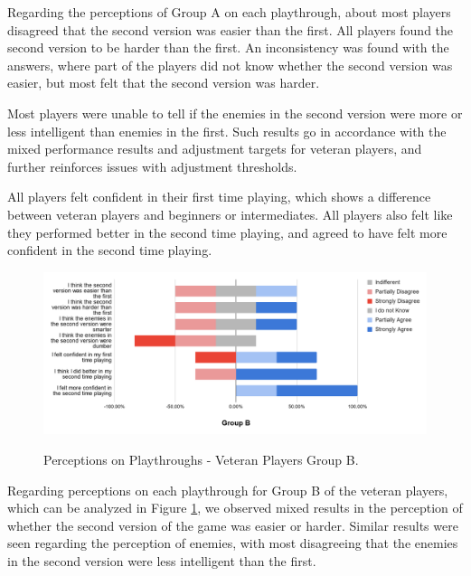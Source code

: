 Regarding the perceptions of Group A on each playthrough, about most players disagreed that the second version was easier than the first. All players found the second version to be harder than the first. An inconsistency was found with the answers, where part of the players did not know whether the second version was easier, but most felt that the second version was harder.

Most players were unable to tell if the enemies in the second version were more or less intelligent than enemies in the first. Such results go in accordance with the mixed performance results and adjustment targets for veteran players, and further reinforces issues with adjustment thresholds.

All players felt confident in their first time playing, which shows a difference between veteran players and beginners or intermediates. All players also felt like they performed better in the second time playing, and agreed to have felt more confident in the second time playing.

\begin{figure}[!ht]
    \begin{center}
    \caption{Perceptions on Playthroughs - Veteran Players Group B.}
        \includegraphics[width=36em]{figures/fig-perception-versions-veteran-players-group-b.png}
        \label{fig:perception-playthrough-veteran-players-group-b}
    \end{center}
\end{figure}
Regarding perceptions on each playthrough for Group B of the veteran players, which can be analyzed in Figure \ref{fig:perception-playthrough-veteran-players-group-b}, we observed mixed results in the perception of whether the second version of the game was easier or harder. Similar results were seen regarding the perception of enemies, with most disagreeing that the enemies in the second version were less intelligent than the first. 

